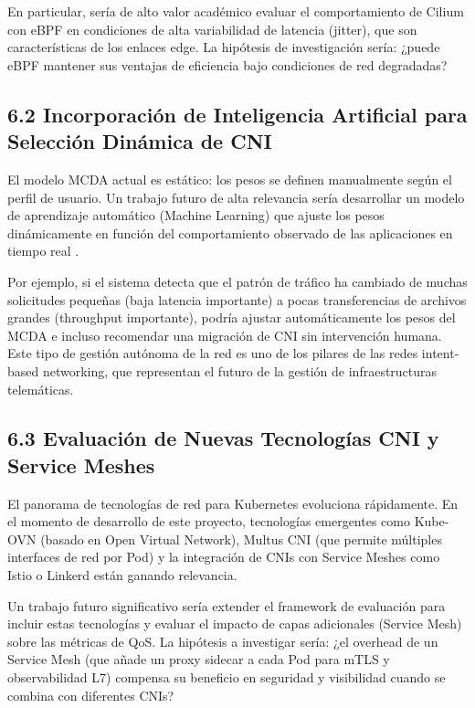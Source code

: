 \documentclass[journal]{IEEEtran}
\begin{document}
En particular, sería de alto valor académico evaluar el comportamiento de Cilium con eBPF en condiciones de alta variabilidad de latencia (jitter), que son características de los enlaces edge. La hipótesis de investigación sería: ¿puede eBPF mantener sus ventajas de eficiencia bajo condiciones de red degradadas?

\subsection{6.2 Incorporación de Inteligencia Artificial para Selección Dinámica de CNI}

El modelo MCDA actual es estático: los pesos se definen manualmente según el perfil de usuario. Un trabajo futuro de alta relevancia sería desarrollar un modelo de aprendizaje automático (Machine Learning) que ajuste los pesos dinámicamente en función del comportamiento observado de las aplicaciones en tiempo real \cite{ref2}.

Por ejemplo, si el sistema detecta que el patrón de tráfico ha cambiado de muchas solicitudes pequeñas (baja latencia importante) a pocas transferencias de archivos grandes (throughput importante), podría ajustar automáticamente los pesos del MCDA e incluso recomendar una migración de CNI sin intervención humana. Este tipo de gestión autónoma de la red es uno de los pilares de las redes intent-based networking, que representan el futuro de la gestión de infraestructuras telemáticas.

\subsection{6.3 Evaluación de Nuevas Tecnologías CNI y Service Meshes}

El panorama de tecnologías de red para Kubernetes evoluciona rápidamente. En el momento de desarrollo de este proyecto, tecnologías emergentes como Kube-OVN (basado en Open Virtual Network), Multus CNI (que permite múltiples interfaces de red por Pod) y la integración de CNIs con Service Meshes como Istio o Linkerd están ganando relevancia.

Un trabajo futuro significativo sería extender el framework de evaluación para incluir estas tecnologías y evaluar el impacto de capas adicionales (Service Mesh) sobre las métricas de QoS. La hipótesis a investigar sería: ¿el overhead de un Service Mesh (que añade un proxy sidecar a cada Pod para mTLS y observabilidad L7) compensa su beneficio en seguridad y visibilidad cuando se combina con diferentes CNIs?
\end{document}
